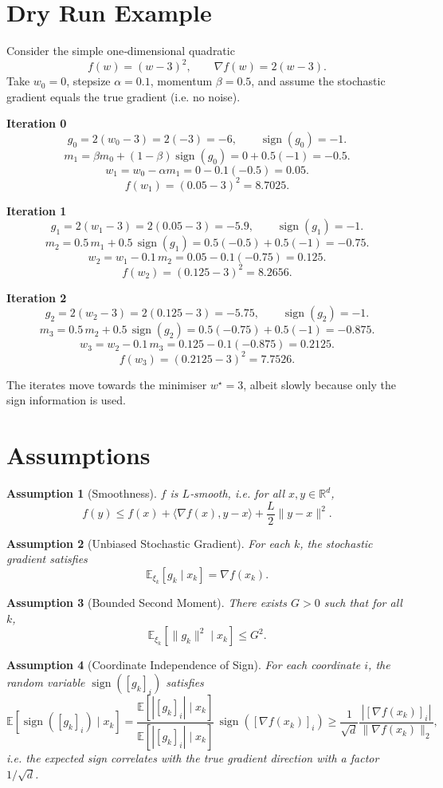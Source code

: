 \documentclass{article}
\newtheorem{assumption}{Assumption}
\newcommand{\sign}{\operatorname{sign}}
\newcommand{\E}{\mathbb{E}}
\newcommand{\R}{\mathbb{R}}
\begin{document}
\section*{Dry Run Example}
Consider the simple one‑dimensional quadratic
\[
f(w) = (w-3)^{2},\qquad \nabla f(w)=2(w-3).
\]
Take $w_{0}=0$, stepsize $\alpha=0.1$, momentum $\beta=0.5$, and assume the stochastic gradient equals the true gradient (i.e. no noise).  

\medskip
\textbf{Iteration 0}
\[
g_{0}=2(w_{0}-3)=2(-3)=-6,\qquad
\sign(g_{0})=-1.
\]
\[
m_{1}= \beta m_{0}+(1-\beta)\sign(g_{0})=0+0.5(-1)=-0.5.
\]
\[
w_{1}= w_{0}-\alpha m_{1}=0-0.1(-0.5)=0.05.
\]
\[
f(w_{1})=(0.05-3)^{2}=8.7025.
\]

\textbf{Iteration 1}
\[
g_{1}=2(w_{1}-3)=2(0.05-3)=-5.9,\qquad \sign(g_{1})=-1.
\]
\[
m_{2}=0.5\,m_{1}+0.5\,\sign(g_{1})=0.5(-0.5)+0.5(-1)=-0.75.
\]
\[
w_{2}= w_{1}-0.1\,m_{2}=0.05-0.1(-0.75)=0.125.
\]
\[
f(w_{2})=(0.125-3)^{2}=8.2656.
\]

\textbf{Iteration 2}
\[
g_{2}=2(w_{2}-3)=2(0.125-3)=-5.75,\qquad \sign(g_{2})=-1.
\]
\[
m_{3}=0.5\,m_{2}+0.5\,\sign(g_{2})=0.5(-0.75)+0.5(-1)=-0.875.
\]
\[
w_{3}= w_{2}-0.1\,m_{3}=0.125-0.1(-0.875)=0.2125.
\]
\[
f(w_{3})=(0.2125-3)^{2}=7.7526.
\]

The iterates move towards the minimiser $w^{\star}=3$, albeit slowly because only the sign information is used.

\newpage
\section*{Assumptions}
\begin{assumption}[Smoothness]\label{ass:smooth}
$f$ is $L$‑smooth, i.e. for all $x,y\in\R^{d}$,
\[
f(y)\le f(x)+\langle \nabla f(x),y-x\rangle+\frac{L}{2}\|y-x\|^{2}.
\]
\end{assumption}

\begin{assumption}[Unbiased Stochastic Gradient]\label{ass:unbiased}
For each $k$, the stochastic gradient satisfies
\[
\E_{\xi_{k}}[g_{k}\mid x_{k}]=\nabla f(x_{k}).
\]
\end{assumption}

\begin{assumption}[Bounded Second Moment]\label{ass:bounded}
There exists $G>0$ such that for all $k$,
\[
\E_{\xi_{k}}[\|g_{k}\|^{2}\mid x_{k}]\le G^{2}.
\]
\end{assumption}

\begin{assumption}[Coordinate Independence of Sign]\label{ass:sign}
For each coordinate $i$, the random variable $\sign([g_{k}]_{i})$ satisfies
\[
\E[\sign([g_{k}]_{i})\mid x_{k}]=\frac{\E[|[g_{k}]_{i}| \mid x_{k}]}{\E[|[g_{k}]_{i}| \mid x_{k}]} \,\sign([\nabla f(x_{k})]_{i})
\ge \frac{1}{\sqrt{d}}\frac{|[\nabla f(x_{k})]_{i}|}{\|\nabla f(x_{k})\|_{2}},
\]
i.e. the expected sign correlates with the true gradient direction with a factor $1/\sqrt d$.
\end{assumption}
\end{document}

